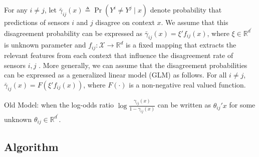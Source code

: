  For any $i\neq j$,  let $\bar{\gamma}_{ij}(x) \triangleq \Pr(Y^{i} \neq Y^{j}\mid x)$ denote probability that predictions of sensors $i$ and $j$ disagree on context $x$. We assume that this disagreement probability can be expressed as $\bar{\gamma}_{ij}(x)=\xi'f_{ij}(x)$, where $\xi \in \mathbb{R}^{d^\prime}$ is unknown parameter and $f_{ij}: \mathcal{X}\rightarrow \mathbb{R}^d$ is a fixed mapping that extracts the relevant features from each context that influence the disagreement rate of sensors $i,j$ .  More generally, we can assume that the disagreement probabilities can be expressed as a generalized linear model (GLM) as follows. For all $i\neq j$,  $\bar{\gamma}_{ij}(x)=F(\xi'f_{ij}(x))$, where $F(\cdot)$ is a non-negative real valued function.
 
 
 {Old Model:} when the log-odds ratio $\log \frac{\gamma_{ij}(x)}{1-\gamma_{ij}(x)}$ can be written as $\theta_{ij}'x$ for some unknown $\theta_{ij} \in \mathbb{R}^{d^\prime}$.
 
 \subsection{Algorithm}
\vspace{-5pt}

